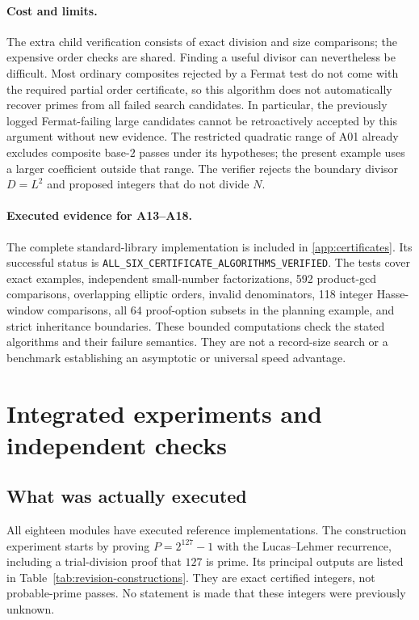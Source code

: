 \documentclass[11pt,a4paper]{article}
\theoremstyle{definition}\newtheorem{definition}[theorem]{Definition}
\theoremstyle{remark}\newtheorem{remark}[theorem]{Remark}
\begin{document}
\paragraph{Cost and limits.}
The extra child verification consists of exact division and size
comparisons; the expensive order checks are shared.  Finding a useful
divisor can nevertheless be difficult.  Most ordinary composites rejected
by a Fermat test do not come with the required partial order certificate,
so this algorithm does not automatically recover primes from all failed
search candidates.  In particular, the previously logged Fermat-failing
large candidates cannot be retroactively accepted by this argument without
new evidence.  The restricted quadratic range of A01 already excludes
composite base-$2$ passes under its hypotheses; the present example uses
a larger coefficient outside that range.  The verifier rejects the
boundary divisor $D=L^2$ and proposed integers that do not divide $N$.

\paragraph{Executed evidence for A13--A18.}
The complete standard-library implementation is included in
\cref{app:certificates}.  Its successful status is
\texttt{ALL\_SIX\_CERTIFICATE\_ALGORITHMS\_VERIFIED}.
The tests cover exact examples, independent small-number factorizations,
592 product-gcd comparisons, overlapping elliptic orders, invalid
denominators, 118 integer Hasse-window comparisons, all $64$ proof-option
subsets in the planning example, and strict inheritance boundaries.
These bounded computations check the stated algorithms and their failure
semantics.  They are not a record-size search or a benchmark establishing
an asymptotic or universal speed advantage.

\section{Integrated experiments and independent checks}
\label{sec:revision-experiments}

\subsection{What was actually executed}

All eighteen modules have executed reference implementations. The
construction experiment starts by proving $P=2^{127}-1$ with the
Lucas--Lehmer recurrence, including a trial-division proof that $127$ is
prime. Its principal outputs are listed in
Table~\ref{tab:revision-constructions}. They are exact certified integers,
not probable-prime passes. No statement is made that these integers were
previously unknown.
\end{document}
